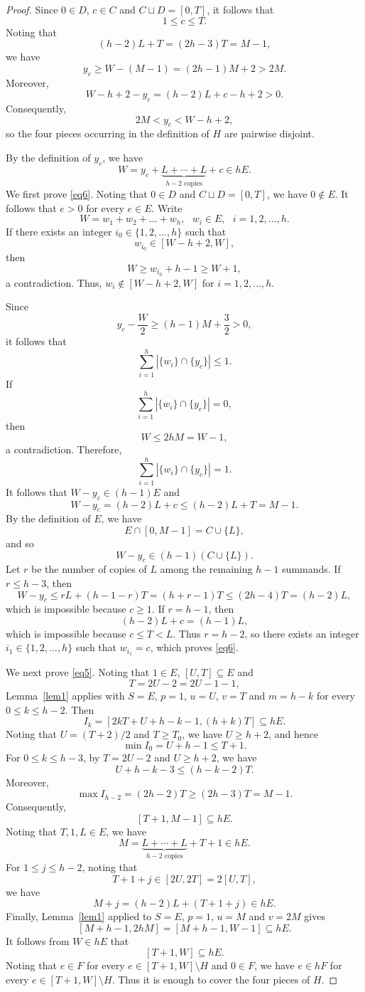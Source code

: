 \documentclass[reqno,12pt,twoside]{article}
\numberwithin{equation}{section}
\begin{document}
\begin{proof}
Since $0\in D$, $c\in C$ and $C\sqcup D=[0,T]$, it follows that
\[
 1\le c\le T.
\]
Noting that
\[
 (h-2)L+T=(2h-3)T=M-1,
\]
we have
\[
 y_c\ge W-(M-1)=(2h-1)M+2>2M.
\]
Moreover,
\[
 W-h+2-y_c=(h-2)L+c-h+2>0.
\]
Consequently,
\[
 2M<y_c<W-h+2,
\]
so the four pieces occurring in the definition of $H$ are pairwise disjoint.

By the definition of $y_c$, we have
\[
 W=y_c+\underbrace{L+\cdots+L}_{h-2\text{ copies}}+c\in hE.
\]
We first prove \eqref{eq6}. Noting that $0\in D$ and $C\sqcup D=[0,T]$, we have $0\notin E$. It follows that $e>0$ for every $e\in E$. Write
\[W=w_1+w_2+\ldots+w_h,~~~ w_i\in E,~~~i=1,2,\ldots,h.
\]
If there exists an integer $i_0\in\{1,2,\ldots,h\}$ such that
\[
 w_{i_0}\in[W-h+2,W],
\]
then 
\[
 W\ge w_{i_0}+h-1\ge W+1,
\]
a contradiction. Thus, $w_i\not\in [W-h+2,W]$ for $i=1,2,\ldots,h$.

Since
\[
 y_c-\frac W2\ge (h-1)M+\frac32>0,
\]
it follows that
\[
\sum\limits_{i=1}^{h}|\{w_i\}\cap\{y_c\}|\leq 1.
\] 
If \[
\sum\limits_{i=1}^{h}|\{w_i\}\cap\{y_c\}|=0,
\] 
then 
\[
 W\le 2hM=W-1,
\]
a contradiction. Therefore,
\[
\sum\limits_{i=1}^{h}|\{w_i\}\cap\{y_c\}|=1.
\] 
It follows that $W-y_c\in (h-1)E$ and
\[
 W-y_c=(h-2)L+c\le(h-2)L+T=M-1.
\]
By the definition of $E$, we have
\[
 E\cap[0,M-1]=C\cup\{L\},
\]
and so \[
W-y_c\in (h-1)(C\cup\{L\}).
\] 
Let $r$ be the number of copies of $L$ among the remaining $h-1$ summands. If $r\le h-3$, then
\[
W-y_c\leq rL+(h-1-r)T=(h+r-1)T\le(2h-4)T=(h-2)L,
\]
which is impossible because $c\ge1$. If $r=h-1$, then
\[
 (h-2)L+c=(h-1)L,
\]
which is impossible because $c\le T<L$. Thus $r=h-2$, so there exists an integer $i_1\in\{1,2,\ldots,h\}$ such that $w_{i_1}=c$, which proves \eqref{eq6}.

We next prove \eqref{eq5}. Noting that $1\in E$, $[U,T]\subseteq E$ and 
\[
 T=2U-2=2U-1-1,
\]
Lemma~\ref{lem1} applies with $S=E$, $p=1$, $u=U$, $v=T$ and $m=h-k$ for every $0\le k\le h-2$.
Then
\[
 I_k=[2kT+U+h-k-1,(h+k)T]\subseteq hE.
\]
Noting that $U=(T+2)/2$ and $T\ge T_0$, we have $U\ge h+2$, and hence
\[
 \min I_0=U+h-1\le T+1.
\]
For $0\le k\le h-3$, by $T=2U-2$ and $U\ge h+2$, we have
\[
 U+h-k-3\le(h-k-2)T.
\]
Moreover,
\[
 \max I_{h-2}=(2h-2)T\ge(2h-3)T=M-1.
\]
Consequently,
\[
 [T+1,M-1]\subseteq hE.
\]
Noting that $T,1,L\in E$, we have
\[
 M=\underbrace{L+\cdots+L}_{h-2\text{ copies}}+T+1\in hE.
\]
For $1\le j\le h-2$, noting that
\[
 T+1+j\in[2U,2T]=2[U,T],
\]
we have
\[
 M+j=(h-2)L+(T+1+j)\in hE.
\]
Finally, Lemma~\ref{lem1} applied to $S=E$, $p=1$, $u=M$ and $v=2M$ gives
\[
 [M+h-1,2hM]=[M+h-1,W-1]\subseteq hE.
\]
It follows from $W\in hE$ that
\[
 [T+1,W]\subseteq hE.
\]
Noting that $e\in F$ for every $e\in [T+1,W]\setminus H$ and $0\in F$, we have $e\in hF$ for every $e\in [T+1,W]\setminus H$. Thus it is enough to cover the four pieces of $H$.


\end{proof}
\end{document}
